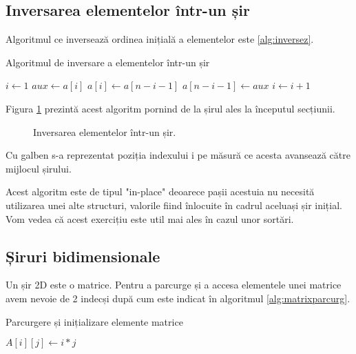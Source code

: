 \subsection{Inversarea elementelor într-un șir}

Algoritmul ce inversează ordinea inițială a elementelor este \ref{alg:inversez}.


\begin{algorithm}[H]
	\caption{Algoritmul de inversare a elementelor într-un șir} \label{alg:inversez}
	\begin{algorithmic}[1]
		\State $i \gets 1$	
		\State $aux \gets a[i]$
		\State $a[i] \gets a[n-i-1]$
		\State $ a[n-i-1] \gets aux$
		\State $i \gets i+1$		
		\EndWhile 
		\EndProcedure
	\end{algorithmic}
\end{algorithm}

Figura \ref{fig:inversare} prezintă acest algoritm pornind de la șirul ales la începutul secțiunii.

\begin{figure}[H] 
	\centering	
	{
	}
	\caption{Inversarea elementelor într-un șir.} 
	\label{fig:inversare}
\end{figure}

Cu galben s-a reprezentat poziția indexului i pe măsură ce acesta avansează către mijlocul șirului.

Acest algoritm este de tipul "in-place" deoarece pașii acestuia nu necesită utilizarea unei alte structuri, valorile fiind înlocuite în cadrul aceluași șir inițial. Vom vedea că acest exercițiu este util mai ales în cazul unor sortări.

\subsection{Șiruri bidimensionale}

Un șir 2D este o matrice. Pentru a parcurge și a accesa elementele unei matrice avem nevoie de 2 indecși după cum este indicat în algoritmul \ref{alg:matrixparcurg}.

\begin{algorithm}[H]
	\caption{Parcurgere și inițializare elemente matrice}\label{alg:matrixparcurg}
	\begin{algorithmic}[1]
		\State $A[i][j] \gets i*j$
		\EndFor 
		\EndFor 
		\EndProcedure
	\end{algorithmic}
\end{algorithm}


